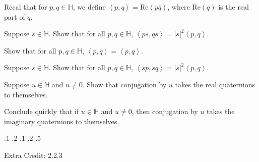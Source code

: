 \documentclass[minion]{homework}
\newcommand{\Reals}{\mathbb{R}}
\def\Quats{\mathbb{H}}
\def\ip<#1,#2>{\left<#1,#2\right>}
\newcommand{\vi}{\mathbf{i}}
\newcommand{\vj}{\mathbf{j}}
\newcommand{\vk}{\mathbf{k}}
\renewcommand{\Re}{\mathrm{Re}}
\begin{document}
\begin{problems}

\problem Recal that for $p,q \in \Quats$, we define $\ip<p,q>=\Re(p\overline q)$,
where $\Re(q)$ is the real part of $q$.
\begin{subproblems}
\item Suppose $s\in \Quats$.  Show that for all $p,q\in\Quats$,
$\ip<ps,qs> = |s|^2\ip<p,q>$.  
\item Show that for all $p,q\in\Quats$, $\ip<\overline p, \overline q>=\ip<p,q>$.
\item Suppose $s\in \Quats$.  Show that for all $p,q\in\Quats$,
$\ip<sp,sq> = |s|^2\ip<p,q>$.  
\item Suppose $u\in\Quats$ and $u\neq 0$.  Show that conjugation by $u$ takes the real quaternions to themselves.
\item Conclude quickly that if $u\in\Quats$ and $u\neq 0$, then
conjugation by $u$ takes the imaginary quaternions to themselves.
\end{subproblems}

.1
.2
.1
.2
.5

\problem Extra Credit: 2.2.3
\end{problems}
\end{document}
